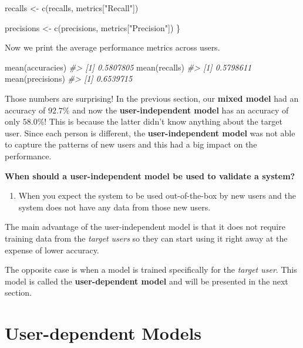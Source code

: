 \documentclass[
  11pt,
]{krantz}
\newenvironment{Shaded}{\begin{snugshade}}{\end{snugshade}}
\newcommand{\CommentTok}[1]{\textcolor[rgb]{0.37,0.37,0.37}{\textit{#1}}}
\newcommand{\FunctionTok}[1]{\textcolor[rgb]{0,0,0}{#1}}
\newcommand{\NormalTok}[1]{#1}
\newcommand{\OtherTok}[1]{\textcolor[rgb]{0.37,0.37,0.37}{#1}}
\newcommand{\StringTok}[1]{\textcolor[rgb]{0.5,0.5,0.5}{#1}}
\providecommand{\tightlist}{%
  \setlength{\itemsep}{0pt}\setlength{\parskip}{0pt}}
\begin{document}
\begin{Shaded}
\begin{Highlighting}[]
\NormalTok{  recalls }\OtherTok{\textless{}{-}} \FunctionTok{c}\NormalTok{(recalls, metrics[}\StringTok{"Recall"}\NormalTok{])}
  
\NormalTok{  precisions }\OtherTok{\textless{}{-}} \FunctionTok{c}\NormalTok{(precisions, metrics[}\StringTok{"Precision"}\NormalTok{])}
\NormalTok{\}}
\end{Highlighting}
\end{Shaded}

Now we print the average performance metrics across users.

\begin{Shaded}
\begin{Highlighting}[]
\FunctionTok{mean}\NormalTok{(accuracies)}
\CommentTok{\#\textgreater{} [1] 0.5807805}
\FunctionTok{mean}\NormalTok{(recalls)}
\CommentTok{\#\textgreater{} [1] 0.5798611}
\FunctionTok{mean}\NormalTok{(precisions)}
\CommentTok{\#\textgreater{} [1] 0.6539715}
\end{Highlighting}
\end{Shaded}

Those numbers are surprising! In the previous section, our \textbf{mixed model} had an accuracy of \(92.7\%\) and now the \textbf{user-independent model} has an accuracy of only \(58.0\%\)! This is because the latter didn't know anything about the target user. Since each person is different, the \textbf{user-independent model} was not able to capture the patterns of new users and this had a big impact on the performance.

\textbf{When should a user-independent model be used to validate a system?}

\begin{enumerate}
\def\labelenumi{\arabic{enumi}.}
\tightlist
\item
  When you expect the system to be used out-of-the-box by new users and the system does not have any data from those new users.
\end{enumerate}

The main advantage of the user-independent model is that it does not require training data from the \emph{target users} so they can start using it right away at the expense of lower accuracy.

The opposite case is when a model is trained specifically for the \emph{target user}. This model is called the \textbf{user-dependent model} and will be presented in the next section.

\hypertarget{user-dependent-models}{%
\section{User-dependent Models}\label{user-dependent-models}}
\end{document}
